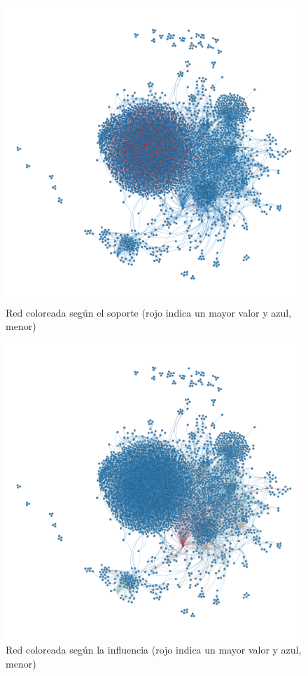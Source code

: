 \begin{figure}
    \centering
    \includegraphics[width=\textwidth]{images/graph/indegree.png}
    \caption{Red coloreada según el soporte (rojo indica un mayor valor y azul, menor)}
    \label{fig:indegree-graph}
\end{figure}

\begin{figure}
    \centering
    \includegraphics[width=\textwidth]{images/graph/outdegree.png}
    \caption{Red coloreada según la influencia (rojo indica un mayor valor y azul, menor)}
    \label{fig:outdegree-graph}
\end{figure}

